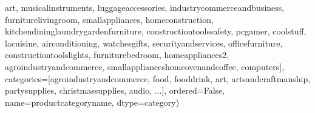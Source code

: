 \documentclass[letterpaper,10pt,english]{jupyterBook}
\begin{document}
\begin{sphinxVerbatim}[commandchars=\\\{\}]
                  \PYGZsq{}art\PYGZsq{}, \PYGZsq{}musical\PYGZus{}instruments\PYGZsq{}, \PYGZsq{}luggage\PYGZus{}accessories\PYGZsq{},
                  \PYGZsq{}industry\PYGZus{}commerce\PYGZus{}and\PYGZus{}business\PYGZsq{}, \PYGZsq{}furniture\PYGZus{}living\PYGZus{}room\PYGZsq{},
                  \PYGZsq{}small\PYGZus{}appliances\PYGZsq{}, \PYGZsq{}home\PYGZus{}construction\PYGZsq{},
                  \PYGZsq{}kitchen\PYGZus{}dining\PYGZus{}laundry\PYGZus{}garden\PYGZus{}furniture\PYGZsq{},
                  \PYGZsq{}construction\PYGZus{}tools\PYGZus{}safety\PYGZsq{}, \PYGZsq{}pc\PYGZus{}gamer\PYGZsq{}, \PYGZsq{}cool\PYGZus{}stuff\PYGZsq{},
                  \PYGZsq{}la\PYGZus{}cuisine\PYGZsq{}, \PYGZsq{}air\PYGZus{}conditioning\PYGZsq{}, \PYGZsq{}watches\PYGZus{}gifts\PYGZsq{},
                  \PYGZsq{}security\PYGZus{}and\PYGZus{}services\PYGZsq{}, \PYGZsq{}office\PYGZus{}furniture\PYGZsq{},
                  \PYGZsq{}construction\PYGZus{}tools\PYGZus{}lights\PYGZsq{}, \PYGZsq{}furniture\PYGZus{}bedroom\PYGZsq{},
                  \PYGZsq{}home\PYGZus{}appliances\PYGZus{}2\PYGZsq{}, \PYGZsq{}agro\PYGZus{}industry\PYGZus{}and\PYGZus{}commerce\PYGZsq{},
                  \PYGZsq{}small\PYGZus{}appliances\PYGZus{}home\PYGZus{}oven\PYGZus{}and\PYGZus{}coffee\PYGZsq{}, \PYGZsq{}computers\PYGZsq{}],
                 categories=[\PYGZsq{}agro\PYGZus{}industry\PYGZus{}and\PYGZus{}commerce\PYGZsq{}, \PYGZsq{}food\PYGZsq{}, \PYGZsq{}food\PYGZus{}drink\PYGZsq{}, \PYGZsq{}art\PYGZsq{}, \PYGZsq{}arts\PYGZus{}and\PYGZus{}craftmanship\PYGZsq{}, \PYGZsq{}party\PYGZus{}supplies\PYGZsq{}, \PYGZsq{}christmas\PYGZus{}supplies\PYGZsq{}, \PYGZsq{}audio\PYGZsq{}, ...], ordered=False, name=\PYGZsq{}product\PYGZus{}category\PYGZus{}name\PYGZsq{}, dtype=\PYGZsq{}category\PYGZsq{})
\end{sphinxVerbatim}

\begin{sphinxVerbatim}[commandchars=\\\{\}]
     
\end{sphinxVerbatim}
\end{document}
